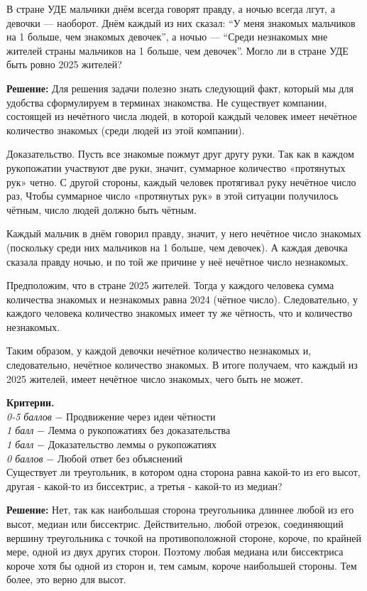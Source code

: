  В стране УДЕ мальчики днём всегда говорят правду, а ночью всегда лгут, а девочки — наоборот. Днём каждый из них сказал: “У меня знакомых мальчиков на 1 больше, чем знакомых девочек”, а ночью — “Среди незнакомых мне жителей страны мальчиков на 1 больше, чем девочек”. Могло ли в стране УДЕ быть ровно 2025 жителей?

\textbf{Решение:} Для решения задачи полезно знать следующий факт, который мы для удобства сформулируем в терминах знакомства. Не существует компании, состоящей из нечётного числа людей, в которой каждый человек имеет нечётное количество знакомых (среди людей из этой компании).

Доказательство. Пусть все знакомые пожмут друг другу руки. Так как в каждом рукопожатии участвуют две руки, значит, суммарное количество «протянутых рук» четно. С другой стороны, каждый человек протягивал руку нечётное число раз, Чтобы суммарное число «протянутых рук» в этой ситуации получилось чётным, число людей должно быть чётным.

Каждый мальчик в днём говорил правду, значит, у него нечётное число знакомых (поскольку среди них мальчиков на 1 больше, чем девочек). А каждая девочка сказала правду ночью, и по той же причине у неё нечётное число незнакомых.

Предположим, что в стране 2025 жителей. Тогда у каждого человека сумма количества знакомых и незнакомых равна 2024 (чётное число). Следовательно, у каждого человека количество знакомых имеет ту же чётность, что и количество незнакомых.

Таким образом, у каждой девочки нечётное количество незнакомых и, следовательно, нечётное количество знакомых. В итоге получаем, что каждый из 2025 жителей, имеет нечётное число знакомых, чего быть не может.

\textbf{Критерии.} \\
\textit{0-5 баллов} $-$ Продвижение через идеи чётности\\
\textit{1 балл} $-$ Лемма о рукопожатиях без доказательства\\
\textit{1 балл} $-$ Доказательство леммы о рукопожатиях\\
\textit{0 баллов} $-$ Любой ответ без объяснений\\

 Существует ли треугольник, в котором одна сторона равна какой-то из его высот, другая - какой-то из биссектрис, а третья - какой-то из медиан?

\textbf{Решение:} Нет, так как наибольшая сторона треугольника длиннее любой из его высот, медиан или биссектрис. Действительно, любой отрезок, соединяющий вершину треугольника с точкой на противоположной стороне, короче, по крайней мере, одной из двух других сторон. Поэтому любая медиана или биссектриса короче хотя бы одной из сторон и, тем самым, короче наибольшей стороны. Тем более, это верно для высот.


